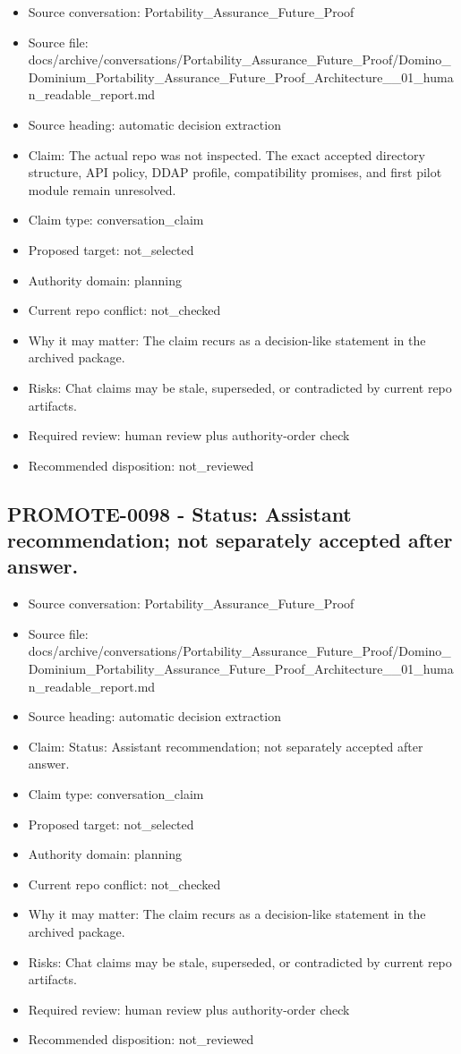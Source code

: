 \documentclass[11pt,a4paper]{report}
\begin{document}
\begin{itemize}
\item Source conversation: Portability\_Assurance\_Future\_Proof
\item Source file: docs/archive/conversations/Portability\_Assurance\_Future\_Proof/Domino\_Dominium\_Portability\_Assurance\_Future\_Proof\_Architecture\_\_01\_human\_readable\_report.md
\item Source heading: automatic decision extraction
\item Claim: The actual repo was not inspected. The exact accepted directory structure, API policy, DDAP profile, compatibility promises, and first pilot module remain unresolved.
\item Claim type: conversation\_claim
\item Proposed target: not\_selected
\item Authority domain: planning
\item Current repo conflict: not\_checked
\item Why it may matter: The claim recurs as a decision-like statement in the archived package.
\item Risks: Chat claims may be stale, superseded, or contradicted by current repo artifacts.
\item Required review: human review plus authority-order check
\item Recommended disposition: not\_reviewed
\end{itemize}

\subsection{PROMOTE-0098 - Status: Assistant recommendation; not separately accepted after answer.}

\begin{itemize}
\item Source conversation: Portability\_Assurance\_Future\_Proof
\item Source file: docs/archive/conversations/Portability\_Assurance\_Future\_Proof/Domino\_Dominium\_Portability\_Assurance\_Future\_Proof\_Architecture\_\_01\_human\_readable\_report.md
\item Source heading: automatic decision extraction
\item Claim: Status: Assistant recommendation; not separately accepted after answer.
\item Claim type: conversation\_claim
\item Proposed target: not\_selected
\item Authority domain: planning
\item Current repo conflict: not\_checked
\item Why it may matter: The claim recurs as a decision-like statement in the archived package.
\item Risks: Chat claims may be stale, superseded, or contradicted by current repo artifacts.
\item Required review: human review plus authority-order check
\item Recommended disposition: not\_reviewed
\end{itemize}
\end{document}
